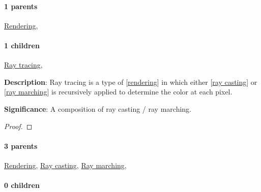 \documentclass[./main.tex]{subfiles}
\begin{document}
\paragraph{1 parents} \hyperref[statement:Rendering]{Rendering}, 
\paragraph{1 children} \hyperref[statement:Ray tracing]{Ray tracing}, 



\begin{statement}
\label{statement:Ray tracing}\hspace*{0pt}\par
\end{statement}
\textbf{Description}:
Ray tracing is a type of [\hyperref[statement:Rendering]{rendering}] in which either [\hyperref[statement:Ray casting]{ray casting}] or [\hyperref[statement:Ray marching]{ray marching}] is recursively applied to determine the color at each pixel.
\par
{\color{magenta} \textbf{Significance}:
A composition of ray casting / ray marching.
\par}
\begin{proof}
\proofbydefinition
\end{proof}\par
\paragraph{3 parents} \hyperref[statement:Rendering]{Rendering}, \hyperref[statement:Ray casting]{Ray casting}, \hyperref[statement:Ray marching]{Ray marching}, 
\paragraph{0 children} 
\end{document}

